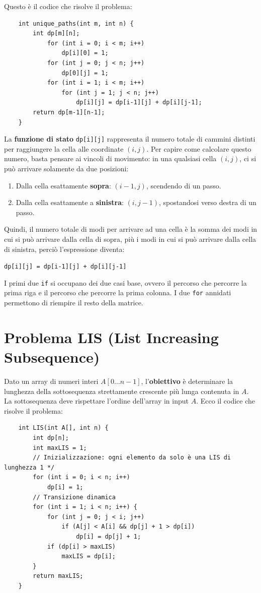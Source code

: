 \noindent Questo è il codice che risolve il problema:
\begin{verbatim}
    int unique_paths(int m, int n) {
        int dp[m][n];
            for (int i = 0; i < m; i++)
                dp[i][0] = 1;
            for (int j = 0; j < n; j++)
                dp[0][j] = 1;
            for (int i = 1; i < m; i++)
                for (int j = 1; j < n; j++)
                    dp[i][j] = dp[i-1][j] + dp[i][j-1];
        return dp[m-1][n-1];
    }
\end{verbatim}
La \textbf{funzione di stato} \texttt{dp[i][j]} rappresenta il numero totale di cammini distinti per raggiungere la cella alle coordinate $(i,j)$. 
Per capire come calcolare questo numero, basta pensare ai vincoli di movimento: in una qualsiasi cella $(i,j)$, ci si può arrivare solamente da due posizioni:
\begin{enumerate}
    \item Dalla cella esattamente \textbf{sopra}: $(i-1,j)$, scendendo di un passo.
    \item Dalla cella esattamente a \textbf{sinistra}: $(i,j-1)$, spostandosi verso destra di un passo.
\end{enumerate} 
Quindi, il numero totale di modi per arrivare ad una cella è la somma dei modi in cui si può arrivare dalla cella di sopra, più i modi in cui si può arrivare 
dalla cella di sinistra, perciò l'espressione diventa:
\begin{center}
\texttt{dp[i][j] = dp[i-1][j] + dp[i][j-1]} 
\end{center}
I primi due \texttt{if} si occupano dei due casi base, ovvero il percorso che percorre la prima riga e il percorso che percorre la prima colonna. 
I due \texttt{for} annidati permettono di riempire il resto della matrice. 


\section{Problema LIS (List Increasing Subsequence)}
Dato un array di numeri interi $A[0\dots n-1]$, l'\textbf{obiettivo} è determinare la lunghezza della sottosequenza strettamente crescente più lunga 
contenuta in $A$. La sottosequenza deve rispettare l'ordine dell'array in input $A$. Ecco il codice che risolve il problema:
\begin{verbatim}
    int LIS(int A[], int n) {
        int dp[n];
        int maxLIS = 1;
        // Inizializzazione: ogni elemento da solo è una LIS di lunghezza 1 */
        for (int i = 0; i < n; i++)
            dp[i] = 1;
        // Transizione dinamica
        for (int i = 1; i < n; i++) {
            for (int j = 0; j < i; j++)
                if (A[j] < A[i] && dp[j] + 1 > dp[i])
                    dp[i] = dp[j] + 1;
            if (dp[i] > maxLIS)
                maxLIS = dp[i];
        }
        return maxLIS;
    }
\end{verbatim}

